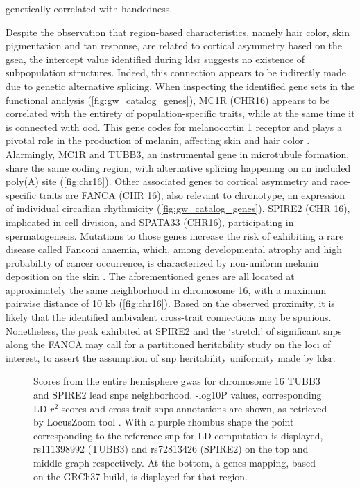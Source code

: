 genetically correlated with handedness.

Despite the observation that region-based characteristics, namely hair color, skin pigmentation and tan response, are related to cortical asymmetry based on the \ac{gsea}, the intercept value identified during \ac{ldsr} suggests no existence of subpopulation structures. Indeed, this connection appears to be indirectly made due to genetic alternative splicing. When inspecting the identified gene sets in the functional analysis (\autoref{fig:gw_catalog_genes}), MC1R (CHR16) appears to be correlated with the entirety of population-specific traits, while at the same time it is connected with \ac{ocd}. This gene codes for melanocortin 1 receptor and plays a pivotal role in the production of melanin, affecting skin and hair color \cite{Swope2018}. Alarmingly, MC1R and TUBB3, an instrumental gene in microtubule formation, share the same coding region, with alternative splicing happening on an included poly(A) site \cite{Dalziel2011}(\autoref{fig:chr16}). Other associated genes to cortical asymmetry and race-specific traits are FANCA (CHR 16), also relevant to chronotype, an expression of individual circadian rhythmicity \cite{Takahashi2018} (\autoref{fig:gw_catalog_genes}), SPIRE2 (CHR 16), implicated in cell division, and SPATA33 (CHR16), participating in spermatogenesis. Mutations to those genes increase the risk of exhibiting a rare disease called Fanconi anaemia, which, among developmental atrophy and high probability of cancer occurrence, is characterized by non-uniform melanin deposition on the skin \cite{Visconti2018}. The aforementioned genes are all located at approximately the same neighborhood in chromosome 16, with a maximum pairwise distance of 10 kb (\autoref{fig:chr16}). Based on the observed proximity, it is likely that the identified ambivalent cross-trait connections may be spurious. Nonetheless, the peak exhibited at SPIRE2 and the `stretch' of significant \acp{snp} along the FANCA may call for a partitioned heritability study on the loci of interest, to assert the assumption of \ac{snp} heritability uniformity made by \ac{ldsr}.



\begin{figure}[H]
	\begin{adjustwidth}{-3cm}{-2.5cm}
		\centering
		\par\medskip
		\caption[Entire hemisphere \ac{gwas} Manhattan plot chromosome 16 peaks  in detail]{Scores from the entire hemisphere \ac{gwas} for chromosome 16 TUBB3 and SPIRE2 lead \acp{snp} neighborhood. -log10P values, corresponding LD $r^2$ scores and cross-trait \acp{snp} annotations are shown, as retrieved by LocusZoom tool \cite{Boughton2021}. With a purple rhombus shape the point corresponding to the reference \ac{snp} for LD computation is displayed, rs111398992 (TUBB3) and rs72813426 (SPIRE2) on the top and middle graph respectively. At the bottom, a genes mapping, based on the GRCh37 build, is displayed for that region.}
		\label{fig:chr16}
	\end{adjustwidth}
\end{figure}


